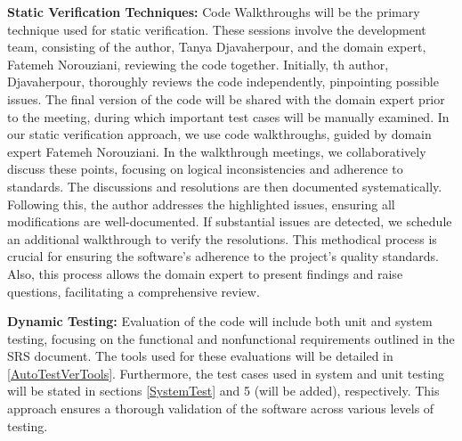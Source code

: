 \documentclass[12pt, titlepage]{article}
\begin{document}
\begin{inparaitem}
  \item \textbf{Static Verification Techniques:}
  Code Walkthroughs will be the primary technique used for static verification. 
  These sessions involve the development team, consisting of the author, Tanya Djavaherpour, 
  and the domain expert, Fatemeh Norouziani, reviewing the code together. 
  Initially, th author, Djavaherpour, thoroughly reviews the code independently, pinpointing 
  possible issues. The final version of the code will be shared with the domain expert prior 
  to the meeting, during which important test cases will be manually examined. 
  In our static verification approach, we use code walkthroughs, 
  guided by domain expert Fatemeh Norouziani. 
  In the walkthrough meetings, we collaboratively discuss these 
  points, focusing on logical inconsistencies and adherence to standards. 
  The discussions and resolutions are then documented systematically. 
  Following this, the author addresses the highlighted issues, ensuring all modifications are well-documented. 
  If substantial issues are detected, we schedule an additional walkthrough to verify the resolutions. 
  This methodical process is crucial for ensuring the software's adherence to the project's quality standards.
  Also, this process allows the domain expert to present findings and raise questions, 
  facilitating a comprehensive review.

  \item \textbf{Dynamic Testing:}
  Evaluation of the code will include both unit and system testing, focusing on 
  the functional and nonfunctional requirements outlined in the
  SRS \citep{SRS} document.
  The tools used for these evaluations will be detailed in \ref{AutoTestVerTools}. Furthermore, the test cases 
  used in system and unit testing will be stated in sections \ref{SystemTest} and 5 (will be added),
  respectively.
  This approach ensures a thorough validation of the software across various levels of testing.

\end{inparaitem}


\end{document}
